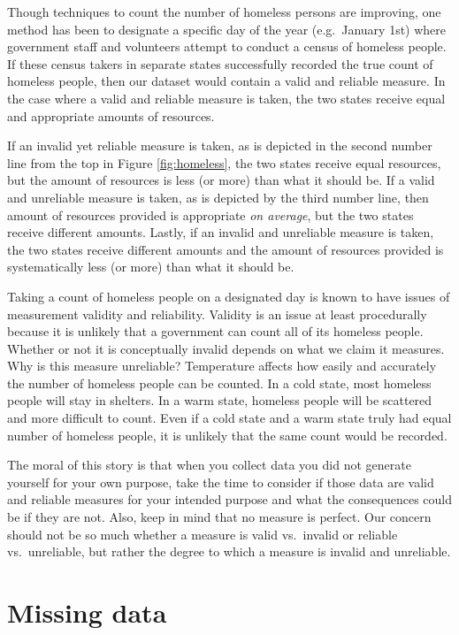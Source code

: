 \documentclass[
]{book}
\begin{document}
Though techniques to count the number of homeless persons are improving, one method has been to designate a specific day of the year (e.g.~January 1st) where government staff and volunteers attempt to conduct a census of homeless people. If these census takers in separate states successfully recorded the true count of homeless people, then our dataset would contain a valid and reliable measure. In the case where a valid and reliable measure is taken, the two states receive equal and appropriate amounts of resources.

If an invalid yet reliable measure is taken, as is depicted in the second number line from the top in Figure \ref{fig:homeless}, the two states receive equal resources, but the amount of resources is less (or more) than what it should be. If a valid and unreliable measure is taken, as is depicted by the third number line, then amount of resources provided is appropriate \emph{on average}, but the two states receive different amounts. Lastly, if an invalid and unreliable measure is taken, the two states receive different amounts and the amount of resources provided is systematically less (or more) than what it should be.

Taking a count of homeless people on a designated day is known to have issues of measurement validity and reliability. Validity is an issue at least procedurally because it is unlikely that a government can count all of its homeless people. Whether or not it is conceptually invalid depends on what we claim it measures. Why is this measure unreliable? Temperature affects how easily and accurately the number of homeless people can be counted. In a cold state, most homeless people will stay in shelters. In a warm state, homeless people will be scattered and more difficult to count. Even if a cold state and a warm state truly had equal number of homeless people, it is unlikely that the same count would be recorded.

The moral of this story is that when you collect data you did not generate yourself for your own purpose, take the time to consider if those data are valid and reliable measures for your intended purpose and what the consequences could be if they are not. Also, keep in mind that no measure is perfect. Our concern should not be so much whether a measure is valid vs.~invalid or reliable vs.~unreliable, but rather the degree to which a measure is invalid and unreliable.

\hypertarget{missing-data}{%
\section{Missing data}\label{missing-data}}
\end{document}
